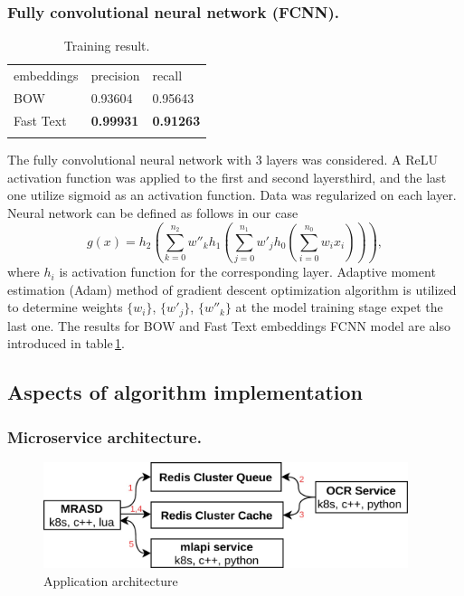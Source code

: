 \documentclass[12pt]{jpconf}
\begin{document}
\subsubsection*{Fully convolutional neural network (FCNN).}

\begin{table}[b]
	\centering
	\caption{\label{tbl:02}Training result.}
	\begin{center}
		\begin{tabular}{lll}
			\br
			embeddings & precision & recall \\
			\mr
			BOW & 0.93604 & 0.95643 \\ \hline
			Fast Text & \bf 0.99931 & \bf 0.91263 \\ 
			\br
		\end{tabular}
	\end{center}
\end{table}

The fully convolutional neural network with 3 layers was considered. A \textsf{ReLU} activation function was applied to the first and second layersthird, and the last one utilize \textsf{sigmoid} as an activation function. Data was regularized on each layer. Neural network can be defined as follows in our case
$$
g(x) = h_2 \left(\sum_{k=0}^{n_2} w''_k h_1\left(\sum_{j=0}^{n_1} w'_j h_0\left( \sum_{i=0}^{n_0} w_i x_i \right)\right)\right),
$$
where $h_i$ is activation function for the corresponding layer. Adaptive moment estimation (Adam) method of gradient descent optimization algorithm is utilized to determine weights $\{w_i\}$, $\{w'_j\}$, $\{w''_k\}$ at the model training stage expet the last one.
The results for BOW and Fast Text embeddings FCNN model are also introduced in table\,\ref{tbl:02}.


\subsection{Aspects of algorithm implementation}

\subsubsection*{Microservice architecture.}

\begin{figure}[t]
	\center
	\includegraphics[width=0.95\textwidth]{images/deploy.jpg}
	\caption{\label{fig:01} Application architecture}
\end{figure}
\end{document}
